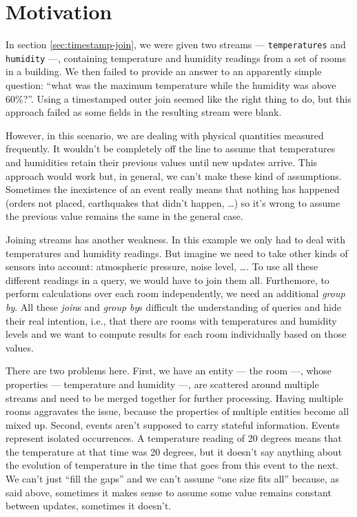 \documentclass{report}
\begin{document}
\section{Motivation}

In section \ref{sec:timestamp-join}, we were given two streams ---
\verb=temperatures= and \verb=humidity= ---, containing temperature
and humidity readings from a set of rooms in a building. We then
failed to provide an answer to an apparently simple question: ``what
was the maximum temperature while the humidity was above
60\%?''. Using a timestamped outer join seemed like the right thing to
do, but this approach failed as some fields in the resulting stream
were blank.

However, in this scenario, we are dealing with physical quantities
measured frequently. It wouldn't be completely off the line to assume
that temperatures and humidities retain their previous values until
new updates arrive. This approach would work but, in general, we can't
make these kind of assumptions. Sometimes the inexistence of an event
really means that nothing has happened (orders not placed, earthquakes
that didn't happen, \ldots) so it's wrong to assume the previous value
remains the same in the general case.

Joining streams has another weakness. In this example we only had to
deal with temperatures and humidity readings. But imagine we need to
take other kinds of sensors into account: atmospheric pressure, noise
level, \ldots. To use all these different readings in a query, we
would have to join them all. Furthemore, to perform calculations over
each room independently, we need an additional \emph{group by}. All
these \emph{join}s and \emph{group by}s difficult the understanding of
queries and hide their real intention, i.e., that there are rooms with
temperatures and humidity levels and we want to compute results for
each room individually based on those values.

There are two problems here. First, we have an entity --- the room
---, whose properties --- temperature and humidity ---, are scattered
around multiple streams and need to be merged together for further
processing. Having multiple rooms aggravates the issue, because the
properties of multiple entities become all mixed up. Second, events
aren't supposed to carry stateful information. Events represent
isolated occurrences. A temperature reading of 20 degrees means that
the temperature at that time was 20 degrees, but it doesn't say
anything about the evolution of temperature in the time that goes from
this event to the next. We can't just ``fill the gaps'' and we can't
assume ``one size fits all'' because, as said above, sometimes it
makes sense to assume some value remains constant between updates,
sometimes it doesn't.
\end{document}
